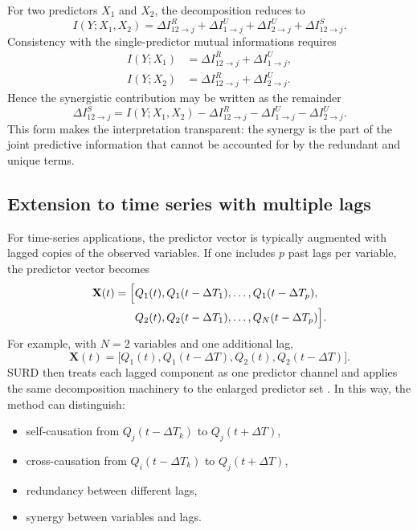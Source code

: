 \documentclass[fleqn,usenatbib]{mnras}
\begin{document}
For two predictors \(X_1\) and \(X_2\), the decomposition reduces to
\begin{equation}
I(Y;X_1,X_2)
=
\Delta I_{12\to j}^{R}
+
\Delta I_{1\to j}^{U}
+
\Delta I_{2\to j}^{U}
+
\Delta I_{12\to j}^{S}.
\label{eq:two_source_total}
\end{equation}
Consistency with the single-predictor mutual informations requires
\begin{align}
I(Y;X_1) &= \Delta I_{12\to j}^{R} + \Delta I_{1\to j}^{U},\\
I(Y;X_2) &= \Delta I_{12\to j}^{R} + \Delta I_{2\to j}^{U}.
\end{align}
Hence the synergistic contribution may be written as the remainder
\begin{equation}
\Delta I_{12\to j}^{S}
=
I(Y;X_1,X_2)
-
\Delta I_{12\to j}^{R}
-
\Delta I_{1\to j}^{U}
-
\Delta I_{2\to j}^{U}.
\end{equation}
This form makes the interpretation transparent: the synergy is the part of the joint predictive information that cannot be accounted for by the redundant and unique terms.

\subsection{Extension to time series with multiple lags}

For time-series applications, the predictor vector is typically augmented with lagged copies of the observed variables. If one includes \(p\) past lags per variable, the predictor vector becomes
\begin{equation}
\begin{split}
\mathbf{X}(t) = \Bigl[ & Q_1(t), Q_1(t-\Delta T_1), \ldots, Q_1(t-\Delta T_p), \\
                       & Q_2(t), Q_2(t-\Delta T_1), \ldots, Q_N(t-\Delta T_p) \Bigr].
\end{split}
\label{eq:lagged_vector_general}
\end{equation}
For example, with \(N=2\) variables and one additional lag,
\begin{equation}
\mathbf{X}(t)=
\bigl[
Q_1(t),Q_1(t-\Delta T),Q_2(t),Q_2(t-\Delta T)
\bigr].
\label{eq:lagged_vector_two}
\end{equation}
SURD then treats each lagged component as one predictor channel and applies the same decomposition machinery to the enlarged predictor set \cite{MartinezSanchez2024SURD}. In this way, the method can distinguish:
\begin{itemize}
    \item self-causation from \(Q_j(t-\Delta T_k)\) to \(Q_j(t+\Delta T)\),
    \item cross-causation from \(Q_i(t-\Delta T_k)\) to \(Q_j(t+\Delta T)\),
    \item redundancy between different lags,
    \item synergy between variables and lags.
\end{itemize}
\end{document}
